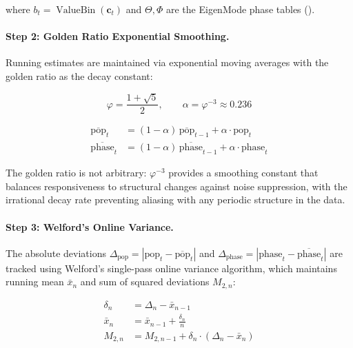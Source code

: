 where $b_t = \operatorname{ValueBin}(\mathbf{c}_t)$ and $\Theta, \Phi$ are
the EigenMode phase tables ().

\paragraph{Step 2: Golden Ratio Exponential Smoothing.}
Running estimates are maintained via exponential moving averages with
the golden ratio as the decay constant:

\begin{equation}
  \varphi = \frac{1 + \sqrt{5}}{2},
  \qquad
  \alpha = \varphi^{-3} \approx 0.236
  \label{eq:golden_ratio}
\end{equation}

\begin{align}
  \overline{\text{pop}}_t &= (1 - \alpha)\,\overline{\text{pop}}_{t-1}
                          + \alpha \cdot \text{pop}_t
  \label{eq:ema_pop} \\
  \overline{\text{phase}}_t &= (1 - \alpha)\,\overline{\text{phase}}_{t-1}
                             + \alpha \cdot \text{phase}_t
  \label{eq:ema_phase}
\end{align}

The golden ratio is not arbitrary: $\varphi^{-3}$ provides a smoothing
constant that balances responsiveness to structural changes against
noise suppression, with the irrational decay rate preventing aliasing
with any periodic structure in the data.

\paragraph{Step 3: Welford's Online Variance.}
The absolute deviations $\Delta_{\text{pop}} = |\text{pop}_t - \overline{\text{pop}}_t|$
and $\Delta_{\text{phase}} = |\text{phase}_t - \overline{\text{phase}}_t|$
are tracked using Welford's single-pass online variance algorithm, which
maintains running mean $\bar{x}_n$ and sum of squared deviations $M_{2,n}$:

\begin{align}
  \delta_n &= \Delta_n - \bar{x}_{n-1}
  \label{eq:welford_delta} \\
  \bar{x}_n &= \bar{x}_{n-1} + \frac{\delta_n}{n}
  \label{eq:welford_mean} \\
  M_{2,n} &= M_{2,n-1} + \delta_n \cdot (\Delta_n - \bar{x}_n)
  \label{eq:welford_m2}
\end{align}

